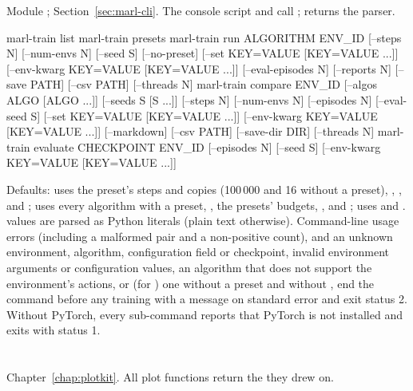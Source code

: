 Module ; Section~\ref{sec:marl-cli}. The
console script  and  call
;  returns the
 parser.

\begin{shellcode}
marl-train list
marl-train presets
marl-train run ALGORITHM ENV_ID [--steps N] [--num-envs N] [--seed S]
               [--no-preset] [--set KEY=VALUE [KEY=VALUE ...]]
               [--env-kwarg KEY=VALUE [KEY=VALUE ...]] [--eval-episodes N]
               [--reports N] [--save PATH] [--csv PATH] [--threads N]
marl-train compare ENV_ID [--algos ALGO [ALGO ...]] [--seeds S [S ...]]
                   [--steps N] [--num-envs N] [--episodes N] [--eval-seed S]
                   [--set KEY=VALUE [KEY=VALUE ...]]
                   [--env-kwarg KEY=VALUE [KEY=VALUE ...]] [--markdown]
                   [--csv PATH] [--save-dir DIR] [--threads N]
marl-train evaluate CHECKPOINT ENV_ID [--episodes N] [--seed S]
                    [--env-kwarg KEY=VALUE [KEY=VALUE ...]]
\end{shellcode}

Defaults:  uses the preset's steps and copies (100\,000 and 16
without a preset), , ,
 and ;  uses every
algorithm with a preset, , the presets' budgets,
,  and ;
 uses  and .
 values are parsed as Python literals (plain text otherwise).
Command-line usage errors (including a malformed  pair and a
non-positive count), and an unknown environment, algorithm, configuration
field or checkpoint, invalid environment arguments or configuration values,
an algorithm that does not support the environment's actions, or (for
) one without a preset and without , end the
command before any training with a message on standard error and exit status
2. Without PyTorch, every sub-command reports that PyTorch is not installed
and exits with status 1.

\section{\texorpdfstring{}{toolkit.plotkit}}\label{sec:api-plotkit}

Chapter~\ref{chap:plotkit}. All plot functions return the
 they drew on.

